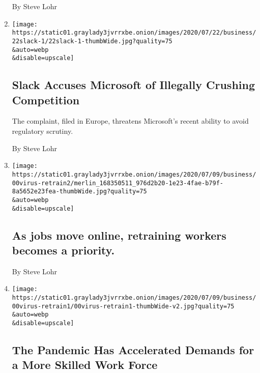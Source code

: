 \begin{enumerate}
  By Steve Lohr
\item
  \href{/2020/07/22/technology/slack-microsoft-antitrust.html}{}

  \texttt{[image: https://static01.graylady3jvrrxbe.onion/images/2020/07/22/business/22slack-1/22slack-1-thumbWide.jpg?quality=75\\\&auto=webp\\\&disable=upscale]}

  \hypertarget{slack-accuses-microsoft-of-illegally-crushing-competition}{%
  \subsection{Slack Accuses Microsoft of Illegally Crushing
  Competition}\label{slack-accuses-microsoft-of-illegally-crushing-competition}}

  The complaint, filed in Europe, threatens Microsoft's recent ability
  to avoid regulatory scrutiny.

  By Steve Lohr
\item
  \href{/2020/07/13/business/as-jobs-move-online-retraining-workers-becomes-a-priority.html}{}

  \texttt{[image: https://static01.graylady3jvrrxbe.onion/images/2020/07/09/business/00virus-retrain2/merlin\_168350511\_976d2b20-1e23-4fae-b79f-8a5652e23fea-thumbWide.jpg?quality=75\\\&auto=webp\\\&disable=upscale]}

  \hypertarget{as-jobs-move-online-retraining-workers-becomes-a-priority}{%
  \subsection{As jobs move online, retraining workers becomes a
  priority.}\label{as-jobs-move-online-retraining-workers-becomes-a-priority}}

  By Steve Lohr
\item
  \href{/2020/07/13/business/coronavirus-retraining-workers.html}{}

  \texttt{[image: https://static01.graylady3jvrrxbe.onion/images/2020/07/09/business/00virus-retrain1/00virus-retrain1-thumbWide-v2.jpg?quality=75\\\&auto=webp\\\&disable=upscale]}

  \hypertarget{the-pandemic-has-accelerated-demands-for-a-more-skilled-work-force}{%
  \subsection{The Pandemic Has Accelerated Demands for a More Skilled
  Work
  Force}\label{the-pandemic-has-accelerated-demands-for-a-more-skilled-work-force}}


\end{enumerate}
